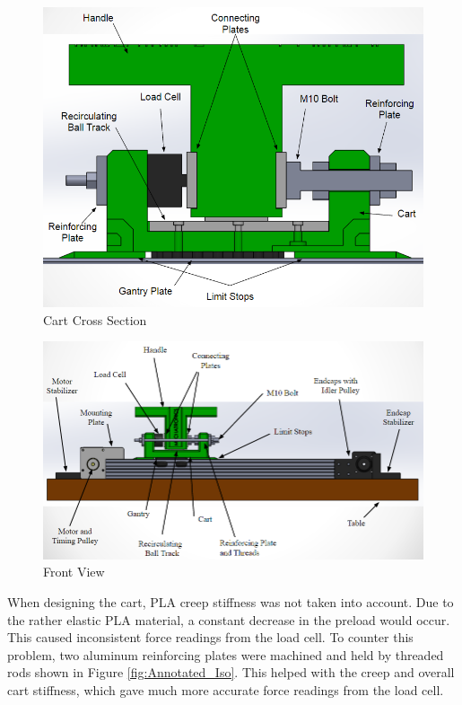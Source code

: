 \begin{figure}[H]
\centering
\includegraphics[width=1\columnwidth]{Images/Ball_Track_Cross_Section}
\caption{Cart Cross Section}
\label{fig:Ball_Track_Cross_Section}
\end{figure}

\begin{figure}[H]
	\centering
	\includegraphics[width=1\linewidth]{Images/Annotated_Front}
	\caption{Front View}
	\label{fig:Annotated_Front}
\end{figure}
When designing the cart, PLA creep stiffness was not taken into account. Due to the rather elastic PLA material, a constant decrease in the preload would occur. This caused inconsistent force readings from the load cell. To counter this problem, two aluminum reinforcing plates were machined and held by threaded rods shown in Figure \ref{fig:Annotated_Iso}. This helped with the creep and overall cart stiffness, which gave much more accurate force readings from the load cell.

